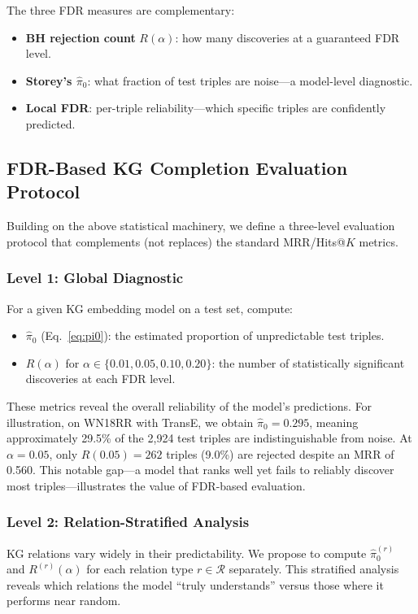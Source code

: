 The three FDR measures are complementary:
\begin{itemize}
    \item \textbf{BH rejection count} $R(\alpha)$: how many discoveries at a guaranteed FDR level.
    \item \textbf{Storey's $\hat{\pi}_0$}: what fraction of test triples are noise---a model-level diagnostic.
    \item \textbf{Local FDR}: per-triple reliability---which specific triples are confidently predicted.
\end{itemize}

\subsection{FDR-Based KG Completion Evaluation Protocol}
\label{subsec:protocol}

Building on the above statistical machinery, we define a three-level evaluation protocol that complements (not replaces) the standard MRR/Hits@$K$ metrics.

\subsubsection{Level 1: Global Diagnostic}
For a given KG embedding model on a test set, compute:
\begin{itemize}
    \item $\hat{\pi}_0$ (Eq.~\ref{eq:pi0}): the estimated proportion of unpredictable test triples.
    \item $R(\alpha)$ for $\alpha \in \{0.01, 0.05, 0.10, 0.20\}$: the number of statistically significant discoveries at each FDR level.
\end{itemize}

These metrics reveal the overall reliability of the model's predictions.
For illustration, on WN18RR with TransE, we obtain $\hat{\pi}_0 = 0.295$, meaning approximately 29.5\% of the 2,924 test triples are indistinguishable from noise.
At $\alpha = 0.05$, only $R(0.05) = 262$ triples (9.0\%) are rejected despite an MRR of 0.560.
This notable gap---a model that ranks well yet fails to reliably discover most triples---illustrates the value of FDR-based evaluation.

\subsubsection{Level 2: Relation-Stratified Analysis}
KG relations vary widely in their predictability. We propose to compute $\hat{\pi}_0^{(r)}$ and $R^{(r)}(\alpha)$ for each relation type $r \in \mathcal{R}$ separately.
This stratified analysis reveals which relations the model ``truly understands'' versus those where it performs near random.

